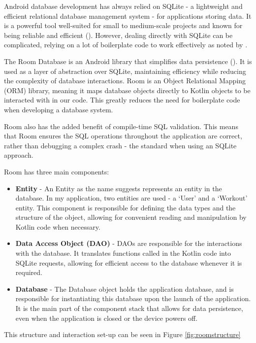 \documentclass{l4proj}
\begin{document}
Android database development has always relied on SQLite - a lightweight and efficient relational database management system - for applications storing data. It is a powerful tool well-suited for small to medium-scale projects and known for being reliable and efficient (\cite{Ferrell_2022}). However, dealing directly with SQLite can be complicated, relying on a lot of boilerplate code to work effectively as noted by \cite{Rawat_2019}.

The Room Database is an Android library that simplifies data persistence (\cite{Rawat_2019}). It is used as a layer of abstraction over SQLite, maintaining efficiency while reducing the complexity of database interactions. Room is an Object Relational Mapping (ORM) library, meaning it maps database objects directly to Kotlin objects to be interacted with in our code. This greatly reduces the need for boilerplate code when developing a database system. 

Room also has the added benefit of compile-time SQL validation. This means that Room ensures the SQL operations throughout the application are correct, rather than debugging a complex crash - the standard when using an SQLite approach.

Room has three main components:

\begin{itemize}
    \item \textbf{Entity} - An Entity as the name suggests represents an entity in the database. In my application, two entities are used - a ‘User’ and a ‘Workout’ entity. This component is responsible for defining the data types and the structure of the object, allowing for convenient reading and manipulation by Kotlin code when necessary.
    \item \textbf{Data Access Object (DAO)} - DAOs are responsible for the interactions with the database. It translates functions called in the Kotlin code into SQLite requests, allowing for efficient access to the database whenever it is required.
    \item \textbf{Database} - The Database object holds the application database, and is responsible for instantiating this database upon the launch of the application. It is the main part of the component stack that allows for data persistence, even when the application is closed or the device powers off.
\end{itemize}

This structure and interaction set-up can be seen in Figure \ref{fig:roomstructure}
\end{document}
